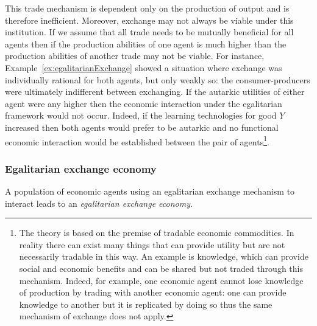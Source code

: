 This trade mechanism is dependent only on the production of output and is therefore inefficient. Moreover, exchange may not always be viable under this institution. If we assume that all trade needs to be mutually beneficial for all agents then if the production abilities of one agent is much higher than the production abilities of another trade may not be viable. For instance, Example~\ref{ex:egalitarianExchange} showed a situation where exchange was individually rational for both agents, but only weakly so: the consumer-producers were ultimately indifferent between exchanging. If the autarkic utilities of either agent were any higher then the economic interaction under the egalitarian framework would not occur. Indeed, if the learning technologies for good $Y$ increased then both agents would prefer to be autarkic and no functional economic interaction would be established between the pair of agents\footnote{The theory is based on the premise of tradable economic commodities. In reality there can exist many things that can provide utility but are not necessarily tradable in this way. An example is knowledge, which can provide social and economic benefits and can be shared but not traded through this mechanism. Indeed, for example, one economic agent cannot lose knowledge of production by trading with another economic agent: one can provide knowledge to another but it is replicated by doing so thus the same mechanism of exchange does not apply.}.

\subsubsection{Egalitarian exchange economy}

A population of economic agents using an egalitarian exchange mechanism to interact leads to an \emph{egalitarian exchange economy}.

